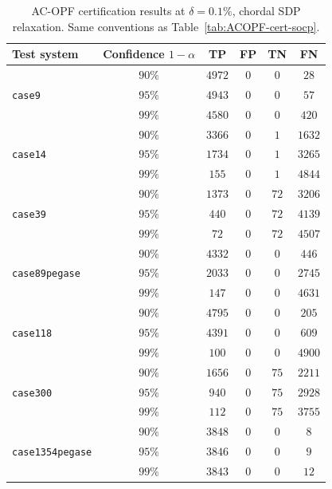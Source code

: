 \documentclass[10pt]{article} %
\theoremstyle{plain}
\theoremstyle{definition}
\theoremstyle{remark}
\begin{document}
\begin{table}[H]
\centering
\footnotesize
\caption{AC-OPF certification results at $\delta = 0.1\%$, chordal SDP relaxation. Same conventions as Table~\ref{tab:ACOPF-cert-socp}.}
\begin{tabular}{lc cccc}
\toprule
\textbf{Test system} & \textbf{Confidence } $1-\alpha$ & \textbf{TP} & \textbf{FP} & \textbf{TN} & \textbf{FN} \\
\midrule
\multirow{3}{*}{\texttt{case9}} & $90\%$ & $4972$ & $0$ & $0$ & $28$ \\
 & $95\%$ & $4943$ & $0$ & $0$ & $57$ \\
 & $99\%$ & $4580$ & $0$ & $0$ & $420$ \\
\midrule
\multirow{3}{*}{\texttt{case14}} & $90\%$ & $3366$ & $0$ & $1$ & $1632$ \\
 & $95\%$ & $1734$ & $0$ & $1$ & $3265$ \\
 & $99\%$ & $155$  & $0$ & $1$ & $4844$ \\
\midrule
\multirow{3}{*}{\texttt{case39}} & $90\%$ & $1373$ & $0$ & $72$ & $3206$ \\
 & $95\%$ & $440$  & $0$ & $72$ & $4139$ \\
 & $99\%$ & $72$   & $0$ & $72$ & $4507$ \\
\midrule
\multirow{3}{*}{\texttt{case89pegase}} & $90\%$ & $4332$ & $0$ & $0$ & $446$ \\
 & $95\%$ & $2033$ & $0$ & $0$ & $2745$ \\
 & $99\%$ & $147$  & $0$ & $0$ & $4631$ \\
\midrule
\multirow{3}{*}{\texttt{case118}} & $90\%$ & $4795$ & $0$ & $0$ & $205$ \\
 & $95\%$ & $4391$ & $0$ & $0$ & $609$ \\
 & $99\%$ & $100$  & $0$ & $0$ & $4900$ \\
\midrule
\multirow{3}{*}{\texttt{case300}} & $90\%$ & $1656$ & $0$ & $75$ & $2211$ \\
 & $95\%$ & $940$  & $0$ & $75$ & $2928$ \\
 & $99\%$ & $112$  & $0$ & $75$ & $3755$ \\
\midrule
\multirow{3}{*}{\texttt{case1354pegase}} & $90\%$ & $3848$ & $0$ & $0$ & $8$ \\
 & $95\%$ & $3846$ & $0$ & $0$ & $9$ \\
 & $99\%$ & $3843$ & $0$ & $0$ & $12$ \\
\bottomrule
\end{tabular}
\label{tab:ACOPF-cert-chordal}
\end{table}
\end{document}
